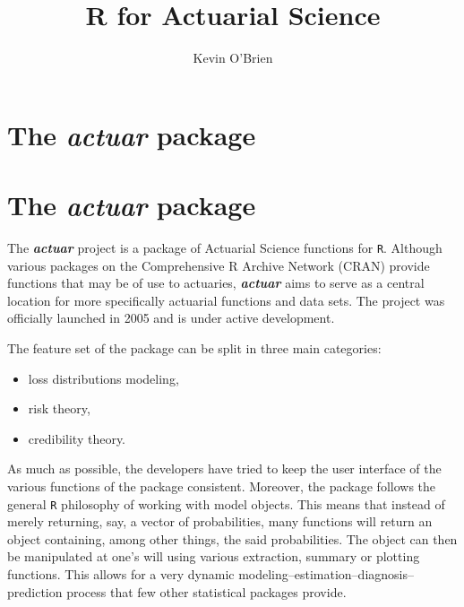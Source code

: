 \documentclass[12pt]{article}
\title{R for Actuarial Science}
\author{Kevin O'Brien}
\begin{document}
\maketitle

\section{The \textit{actuar} package}

\section{The \textit{actuar} package}
The \textbf{\textit{actuar}} project is a package of Actuarial Science functions for \texttt{R}. Although various packages on the Comprehensive R Archive Network (CRAN) provide functions that may be of use to actuaries, \textbf{\textit{actuar}} aims to serve as a central location for more specifically actuarial functions and data sets. The project was officially launched in 2005 and is under active development.

The feature set of the package can be split in three main categories: 
\begin{itemize}
\item loss distributions modeling,
\item risk theory,
\item credibility theory.
\end{itemize}

As much as possible, the developers have tried to keep the user interface of the various functions of the package consistent. Moreover, the package follows the general \texttt{R} philosophy of working with model objects. This means that instead of merely returning, say, a vector of probabilities, many functions will return an object containing, among other things, the said probabilities. The object can then be manipulated at one's will using various extraction, summary or plotting functions. This allows for a very dynamic modeling–estimation–diagnosis–prediction process that few other statistical packages provide.
\end{document}
